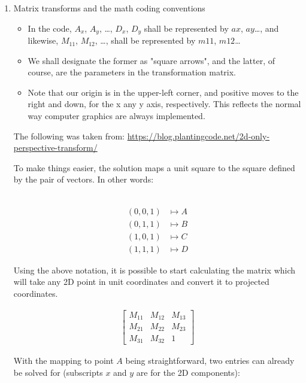 \documentclass[letterpaper, 11pt]{article}
\begin{document}
\begin{enumerate}
\item Matrix transforms and the math coding conventions
\label{sec:orgede2861}

\begin{itemize}
\item In the code, \(A_x\), \(A_y\), \ldots{}, \(D_x\), \(D_y\) shall be represented by \(ax\), \(ay\)\ldots{},
and likewise, \(M_{11}\), \(M_{12}\), \ldots{}, shall be represented by \(m11\), \(m12\)\ldots{}

\item We shall designate the former as "square arrows", and the latter, of course,
are the parameters in the transformation matrix.

\item Note that our origin is in the upper-left corner, and positive moves to the right
and down, for the x any y axis, respectively. This reflects the normal way
computer graphics are always implemented.
\end{itemize}

The following was taken from:
\url{https://blog.plantingcode.net/2d-only-perspective-transform/}

To make things easier, the solution maps a unit square to the
square defined by the pair of vectors. In other words:

$$
\begin{align}
(0, 0, 1) &\mapsto A \\
(0, 1, 1) &\mapsto B \\
(1, 0, 1) &\mapsto C \\
(1, 1, 1) &\mapsto D
\end{align}

Using the above notation, it is possible to
start calculating the matrix which will take any 2D point in
unit coordinates and convert it to projected coordinates.

\begin{align}
\left[ { \begin{array}{ccc}
M_{11} & M_{12} & M_{13} \\
M_{21} & M_{22} & M_{23} \\
M_{31} & M_{32} & 1
\end{array} } \right]
\end{align}

With the mapping to point \(A\) being straightforward, two 
entries can already be solved for (subscripts \(x\) and \(y\) are for the 2D components):


\end{enumerate}
\end{document}
